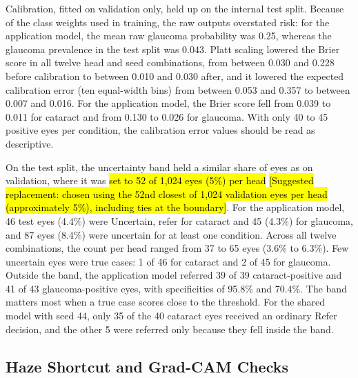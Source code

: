 \documentclass[conference,a4paper]{IEEEtran}
\newcommand{\proposedreplacement}[1]{{\sethlcolor{reviewred}\hl{#1}}}
\newcommand{\suggestedwording}[1]{{\sethlcolor{reviewgreen}\hl{[Suggested replacement: #1]}}}
\begin{document}
Calibration, fitted on validation only, held up on the internal test split. Because of the class
weights used in training, the raw outputs overstated risk: for the application model, the mean raw
glaucoma probability was 0.25, whereas the glaucoma prevalence in the test split was 0.043. Platt
scaling lowered the Brier score in all twelve head and seed combinations, from between 0.030 and
0.228 before calibration to between 0.010 and 0.030 after, and it lowered the expected calibration
error (ten equal-width bins) from between 0.053 and 0.357 to between 0.007 and 0.016. For the
application model, the Brier score fell from 0.039 to 0.011 for cataract and from 0.130 to 0.026 for
glaucoma. With only 40 to 45 positive eyes per condition, the calibration error values should be
read as descriptive.

On the test split, the uncertainty band held a similar share of eyes as on validation, where it was
\proposedreplacement{set to 52 of 1,024 eyes (5\%) per head} \suggestedwording{chosen using the 52nd closest of 1,024 validation eyes per head (approximately 5\%), including ties at the boundary}. For the application model, 46 test eyes (4.4\%) were
Uncertain, refer for cataract and 45 (4.3\%) for glaucoma, and 87 eyes (8.4\%) were uncertain for at
least one condition. Across all twelve combinations, the count per head ranged from 37 to 65 eyes
(3.6\% to 6.3\%). Few uncertain eyes were true cases: 1 of 46 for cataract and 2 of 45 for glaucoma.
Outside the band, the application model referred 39 of 39 cataract-positive and 41 of 43
glaucoma-positive eyes, with specificities of 95.8\% and 70.4\%. The band matters most when a true
case scores close to the threshold. For the shared model with seed 44, only 35 of the 40 cataract
eyes received an ordinary Refer decision, and the other 5 were referred only because they fell
inside the band.

\subsection{Haze Shortcut and Grad-CAM Checks}
\end{document}
